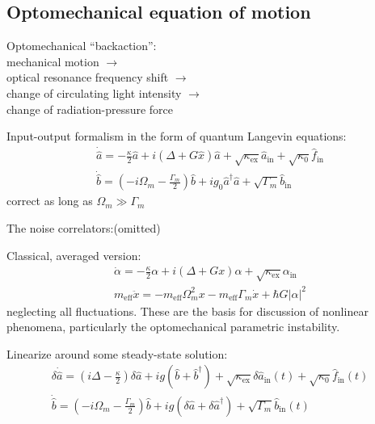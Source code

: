 \documentclass[8pt,a4paper,twocolumn]{article} %
\numberwithin{equation}{section} %
\begin{document}

		\subsection{Optomechanical equation of motion} %
		\label{sub:optomechanical_equation_of_motion}
			Optomechanical ``backaction'':\\
			mechanical motion $\rightarrow$\\
			optical resonance frequency shift $ \rightarrow $\\
			change of circulating light intensity $\rightarrow $\\
			change of radiation-pressure force

			Input-output formalism in the form of quantum Langevin equations:
			\begin{gather}
				\dot{\hat a}=-\frac{\kappa}{2}\hat a+i(\Delta+G \hat x)\hat a+\sqrt{\kappa_{\text{ex}}} \hat a_{\text{in}}+\sqrt{\kappa_0}\hat f_{\text{in}}\\
				\dot{\hat b}=\left( -i \Omega_m- \frac{\Gamma_m}{2} \right)\hat b + i g_0 \hat a^\dagger \hat a+\sqrt{\Gamma_m}\hat b_{\text{in}}
			\end{gather}
			correct as long as $ \Omega_m\gg \Gamma_m $

			The noise correlators:(omitted)

			Classical, averaged version:
			\begin{gather}
				\dot \alpha = -\frac{\kappa}{2} \alpha+i(\Delta+G  x) \alpha+\sqrt{\kappa_{\text{ex}}}  \alpha_{\text{in}}\\
				m_{\text{eff}} \ddot x=-m_{\text{eff}} \Omega_m^2 x-m_{\text{eff}}\Gamma_m \dot x+\hbar G |\alpha|^2
			\end{gather}
			neglecting all fluctuations. These are the basis for discussion of nonlinear phenomena, particularly the optomechanical parametric instability.

			Linearize around some steady-state solution:
			\begin{gather}
				\delta \dot{\hat a}=(i \Delta- \frac{\kappa}{2} )\delta\hat a+ig( \hat b+\hat b^\dagger )+\sqrt{\kappa_{\text{ex}}}\delta \hat a_{\text{in}}(t)+\sqrt{\kappa_0}\hat f_{\text{in}}(t)\\
				\dot{\hat b}=(-i \Omega_m - \frac{\Gamma_m}{2} )\hat b+ig ( \delta\hat a+\delta\hat a^\dagger )+\sqrt{\Gamma_m}\hat b_{\text{in}}(t)
			\end{gather}
\end{document}
